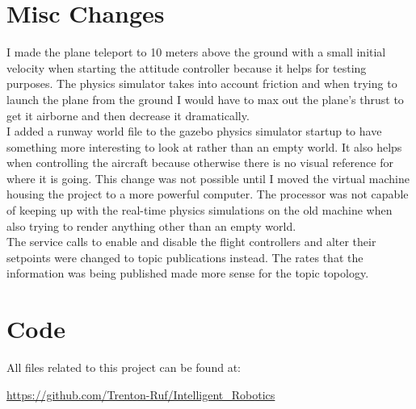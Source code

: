 \documentclass[11pt]{scrartcl} %
\begin{document}
\clearpage

\section{Misc Changes}
I made the plane teleport to 10 meters above the ground with a small initial velocity when starting the attitude controller because it helps for testing purposes. The physics simulator takes into account friction and when trying to launch the plane from the ground I would have to max out the plane’s thrust to get it airborne and then decrease it dramatically.
\\

I added a runway world file to the gazebo physics simulator startup to have something more interesting to look at rather than an empty world. It also helps when controlling the aircraft because otherwise there is no visual reference for where it is going. This change was not possible until I moved the virtual machine housing the project to a more powerful computer. The processor was not capable of keeping up with the real-time physics simulations on the old machine when also trying to render anything other than an empty world. 
\\

The service calls to enable and disable the flight controllers and alter their setpoints were changed to topic publications instead. The rates that the information was being published made more sense for the topic topology.
\clearpage


\section{Code}
All files related to this project can be found at:

\url{https://github.com/Trenton-Ruf/Intelligent_Robotics}


\clearpage


\clearpage
\end{document}

